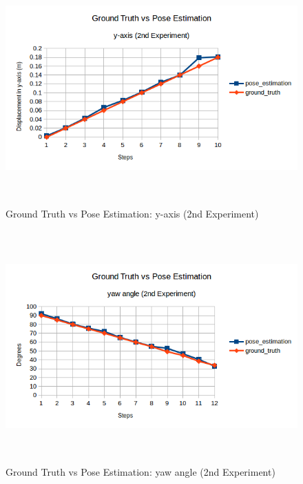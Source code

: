 \begin{itemize}
\begin{figure}[!h]
\begin{center}
\includegraphics[width=5in, height=3.5in]{figures05/2_y_validation.png}
\caption{Ground Truth vs Pose Estimation: y-axis (2nd Experiment)}
\label{fig:errory_2nd}
\end{center}
\end{figure}


\begin{figure}[!h]
\begin{center}
\includegraphics[width=5in, height=3.5in]{figures05/2_yaw_validation.png}
\caption{Ground Truth vs Pose Estimation: yaw angle (2nd Experiment)}
\label{fig:erroryaw_2nd}
\end{center}
\end{figure}


\end{itemize}






